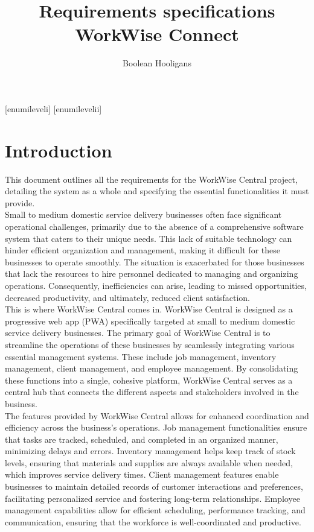 \documentclass{article}
\title{%
	Requirements specifications \\
	\large WorkWise Connect}
\author{Boolean Hooligans}
\begin{document}
	
	[enumileveli]
	[enumilevelii]
	
	
	
	\maketitle
	\newpage
	
	\section*{Introduction}	
	
	This document outlines all the requirements for the WorkWise Central project, detailing the system as a whole and specifying the essential functionalities it must provide.\\
	
	Small to medium domestic service delivery businesses often face significant operational challenges, primarily due to the absence of a comprehensive software system that caters to their unique needs. This lack of suitable technology can hinder efficient organization and management, making it difficult for these businesses to operate smoothly. The situation is exacerbated for those businesses that lack the resources to hire personnel dedicated to managing and organizing operations. Consequently, inefficiencies can arise, leading to missed opportunities, decreased productivity, and ultimately, reduced client satisfaction.\\
	
	This is where WorkWise Central comes in. WorkWise Central is designed as a progressive web app (PWA) specifically targeted at small to medium domestic service delivery businesses. The primary goal of WorkWise Central is to streamline the operations of these businesses by seamlessly integrating various essential management systems. These include job management, inventory management, client management, and employee management. By consolidating these functions into a single, cohesive platform, WorkWise Central serves as a central hub that connects the different aspects and stakeholders involved in the business.\\
	
	The features provided by WorkWise Central allows for enhanced coordination and efficiency across the business’s operations. Job management functionalities ensure that tasks are tracked, scheduled, and completed in an organized manner, minimizing delays and errors. Inventory management helps keep track of stock levels, ensuring that materials and supplies are always available when needed, which improves service delivery times. Client management features enable businesses to maintain detailed records of customer interactions and preferences, facilitating personalized service and fostering long-term relationships. Employee management capabilities allow for efficient scheduling, performance tracking, and communication, ensuring that the workforce is well-coordinated and productive.\\
	
\end{document}
